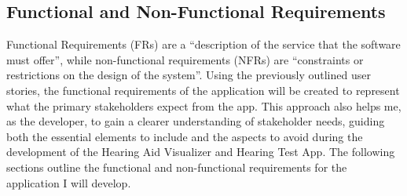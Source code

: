 \documentclass{article}
\begin{document}
\FloatBarrier

\subsection{Functional and Non-Functional Requirements}
Functional Requirements (FRs) are a “description of the service that the software must offer”, while non-functional requirements (NFRs) are “constraints or restrictions on the design of the system”. Using the previously outlined user stories, the functional requirements of the application will be created to represent what the primary stakeholders expect from the app. This approach also helps me, as the developer, to gain a clearer understanding of stakeholder needs, guiding both the essential elements to include and the aspects to avoid during the development of the Hearing Aid Visualizer and Hearing Test App. The following sections outline the functional and non-functional requirements for the application I will develop.
\end{document}
